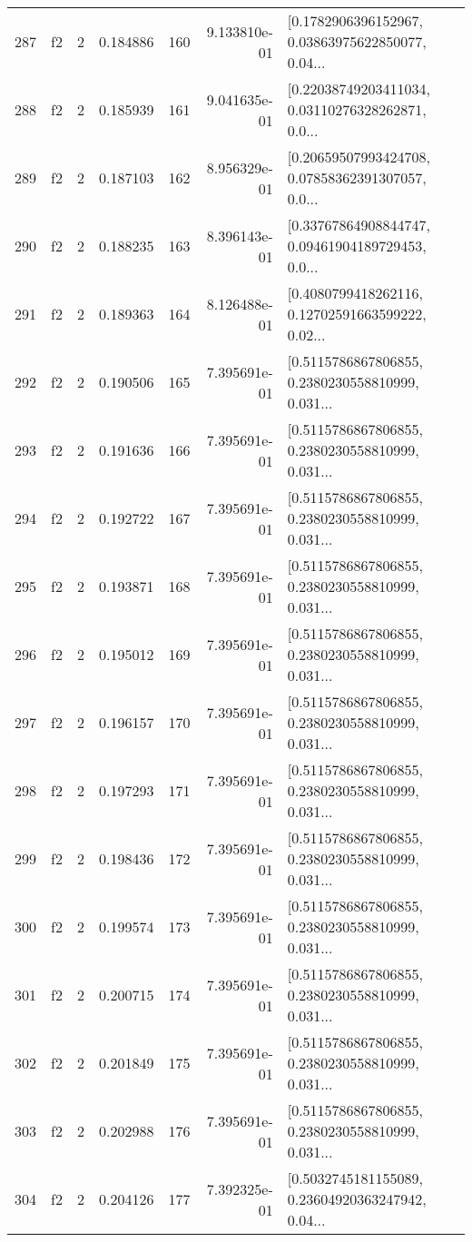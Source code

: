 \begin{tabular}{lllrlrl}
287 &  f2 &   2 &  0.184886 &  160 &  9.133810e-01 &  [0.1782906396152967, 0.03863975622850077, 0.04... \\
288 &  f2 &   2 &  0.185939 &  161 &  9.041635e-01 &  [0.22038749203411034, 0.03110276328262871, 0.0... \\
289 &  f2 &   2 &  0.187103 &  162 &  8.956329e-01 &  [0.20659507993424708, 0.07858362391307057, 0.0... \\
290 &  f2 &   2 &  0.188235 &  163 &  8.396143e-01 &  [0.33767864908844747, 0.09461904189729453, 0.0... \\
291 &  f2 &   2 &  0.189363 &  164 &  8.126488e-01 &  [0.4080799418262116, 0.12702591663599222, 0.02... \\
292 &  f2 &   2 &  0.190506 &  165 &  7.395691e-01 &  [0.5115786867806855, 0.2380230558810999, 0.031... \\
293 &  f2 &   2 &  0.191636 &  166 &  7.395691e-01 &  [0.5115786867806855, 0.2380230558810999, 0.031... \\
294 &  f2 &   2 &  0.192722 &  167 &  7.395691e-01 &  [0.5115786867806855, 0.2380230558810999, 0.031... \\
295 &  f2 &   2 &  0.193871 &  168 &  7.395691e-01 &  [0.5115786867806855, 0.2380230558810999, 0.031... \\
296 &  f2 &   2 &  0.195012 &  169 &  7.395691e-01 &  [0.5115786867806855, 0.2380230558810999, 0.031... \\
297 &  f2 &   2 &  0.196157 &  170 &  7.395691e-01 &  [0.5115786867806855, 0.2380230558810999, 0.031... \\
298 &  f2 &   2 &  0.197293 &  171 &  7.395691e-01 &  [0.5115786867806855, 0.2380230558810999, 0.031... \\
299 &  f2 &   2 &  0.198436 &  172 &  7.395691e-01 &  [0.5115786867806855, 0.2380230558810999, 0.031... \\
300 &  f2 &   2 &  0.199574 &  173 &  7.395691e-01 &  [0.5115786867806855, 0.2380230558810999, 0.031... \\
301 &  f2 &   2 &  0.200715 &  174 &  7.395691e-01 &  [0.5115786867806855, 0.2380230558810999, 0.031... \\
302 &  f2 &   2 &  0.201849 &  175 &  7.395691e-01 &  [0.5115786867806855, 0.2380230558810999, 0.031... \\
303 &  f2 &   2 &  0.202988 &  176 &  7.395691e-01 &  [0.5115786867806855, 0.2380230558810999, 0.031... \\
304 &  f2 &   2 &  0.204126 &  177 &  7.392325e-01 &  [0.5032745181155089, 0.23604920363247942, 0.04... \\

\end{tabular}
